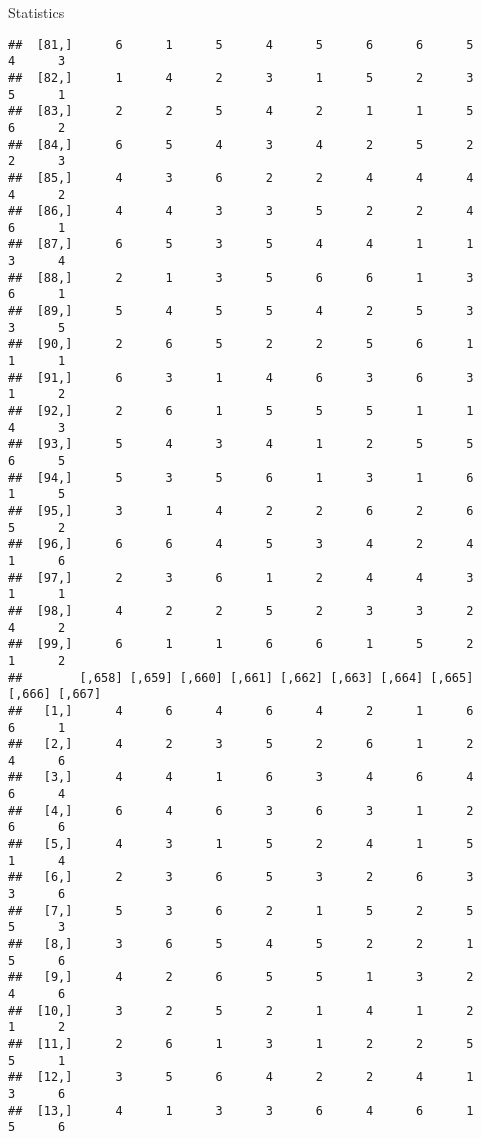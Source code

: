 \documentclass[
  ignorenonframetext,
]{beamer}
\begin{document}
\begin{frame}[fragile]{Statistics}
\begin{verbatim}
##  [81,]      6      1      5      4      5      6      6      5      4      3
##  [82,]      1      4      2      3      1      5      2      3      5      1
##  [83,]      2      2      5      4      2      1      1      5      6      2
##  [84,]      6      5      4      3      4      2      5      2      2      3
##  [85,]      4      3      6      2      2      4      4      4      4      2
##  [86,]      4      4      3      3      5      2      2      4      6      1
##  [87,]      6      5      3      5      4      4      1      1      3      4
##  [88,]      2      1      3      5      6      6      1      3      6      1
##  [89,]      5      4      5      5      4      2      5      3      3      5
##  [90,]      2      6      5      2      2      5      6      1      1      1
##  [91,]      6      3      1      4      6      3      6      3      1      2
##  [92,]      2      6      1      5      5      5      1      1      4      3
##  [93,]      5      4      3      4      1      2      5      5      6      5
##  [94,]      5      3      5      6      1      3      1      6      1      5
##  [95,]      3      1      4      2      2      6      2      6      5      2
##  [96,]      6      6      4      5      3      4      2      4      1      6
##  [97,]      2      3      6      1      2      4      4      3      1      1
##  [98,]      4      2      2      5      2      3      3      2      4      2
##  [99,]      6      1      1      6      6      1      5      2      1      2
##        [,658] [,659] [,660] [,661] [,662] [,663] [,664] [,665] [,666] [,667]
##   [1,]      4      6      4      6      4      2      1      6      6      1
##   [2,]      4      2      3      5      2      6      1      2      4      6
##   [3,]      4      4      1      6      3      4      6      4      6      4
##   [4,]      6      4      6      3      6      3      1      2      6      6
##   [5,]      4      3      1      5      2      4      1      5      1      4
##   [6,]      2      3      6      5      3      2      6      3      3      6
##   [7,]      5      3      6      2      1      5      2      5      5      3
##   [8,]      3      6      5      4      5      2      2      1      5      6
##   [9,]      4      2      6      5      5      1      3      2      4      6
##  [10,]      3      2      5      2      1      4      1      2      1      2
##  [11,]      2      6      1      3      1      2      2      5      5      1
##  [12,]      3      5      6      4      2      2      4      1      3      6
##  [13,]      4      1      3      3      6      4      6      1      5      6

\end{verbatim}
\end{frame}
\end{document}
